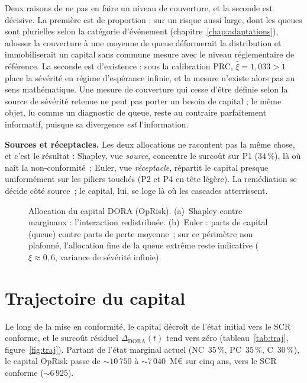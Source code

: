 Deux raisons de ne pas en faire un niveau de couverture, et la seconde est décisive. La
première est de proportion : sur un risque aussi large, dont les queues sont plurielles selon la
catégorie d'événement (chapitre~\ref{chap:adaptations}), adosser la couverture à une moyenne de queue
déformerait la distribution et immobiliserait un capital sans commune mesure avec le niveau
réglementaire de référence. La seconde est d'existence : sous la calibration PRC,
$\hat\xi=1{,}033>1$ place la sévérité en régime d'espérance infinie, et la mesure
n'existe alors pas au sens mathématique. Une mesure de couverture qui cesse d'être définie
selon la source de sévérité retenue ne peut pas porter un besoin de capital ; le même objet,
lu comme un diagnostic de queue, reste au contraire parfaitement informatif, puisque sa
divergence \emph{est} l'information.

\begin{cle}
\textbf{Sources et réceptacles.} Les deux allocations ne racontent pas la même chose, et
c'est le résultat : Shapley, vue \emph{source}, concentre le surcoût sur P1 ($34\,\%$), là
où naît la non-conformité~; Euler, vue \emph{réceptacle}, répartit le capital presque
uniformément sur les piliers touchés (P2 et P4 en tête légère). La remédiation se décide
côté source~; le capital, lui, se loge là où les cascades atterrissent.
\end{cle}

\begin{figure}[htbp]\centering
{}
\caption{Allocation du capital DORA (OpRisk). (a)~Shapley contre marginaux : l'interaction
redistribuée. (b)~Euler : parts de capital (queue) contre parts de perte moyenne~; sur ce
périmètre non plafonné, l'allocation fine de la queue extrême reste indicative
($\xi \approx 0{,}6$, variance de sévérité infinie).}
\label{fig:allocation}
\end{figure}

\section{Trajectoire du capital}
\label{sec:res-traj}

Le long de la mise en conformité, le capital décroît de l'état initial vers le SCR conforme, et
le surcoût résiduel $\Delta_{\text{DORA}}(t)$ tend vers zéro (tableau~\ref{tab:traj},
figure~\ref{fig:traj}). Partant de l'état marginal actuel (NC~$35\,\%$, PC~$35\,\%$, C~$30\,\%$),
le capital OpRisk passe de $\sim 10\,750$ à $\sim 7\,040$~M\euro{} sur cinq ans, vers le SCR
conforme ($\sim 6\,925$).

